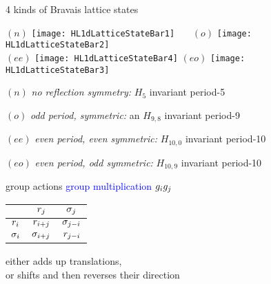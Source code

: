 \begin{frame} {4 kinds of Bravais lattice states}
\begin{center}
{$(n)$}
\texttt{[image: HL1dLatticeStateBar1]}\quad~~~
{$(o)$}
\texttt{[image: HL1dLatticeStateBar2]}
\\ %
{$(ee)$}
\texttt{[image: HL1dLatticeStateBar4]}\quad
{$(eo)$}
\texttt{[image: HL1dLatticeStateBar3]}
  \end{center}

$(n)$ {\em no reflection symmetry:}
    $H_{5}$ invariant period-5 {\lattstate}

$(o)$ {\em odd period, symmetric:}
    an $H_{9,8}$ invariant period-9

$(ee)$ {\em even period, even symmetric:}
    $H_{10,0}$  invariant period-10

$(eo)$ {\em even period, odd symmetric:}
    $H_{10,9}$  invariant period-10
\end{frame} %

\begin{frame} {group actions}
\textcolor{blue}{group multiplication}
$g_ig_j$
\beq
\begin{tabular}{c|cc}
            &$r_{j}$        &$\sigma_j$\\\hline
$r_{i}$  &$r_{i+j}$     &$\sigma_{j-i}$\\
$\sigma_i$   &$\sigma_{i+j}$     &$r_{j-i}$
\end{tabular}
either adds up translations,
\\
or shifts and then reverses their direction
\end{frame} %

